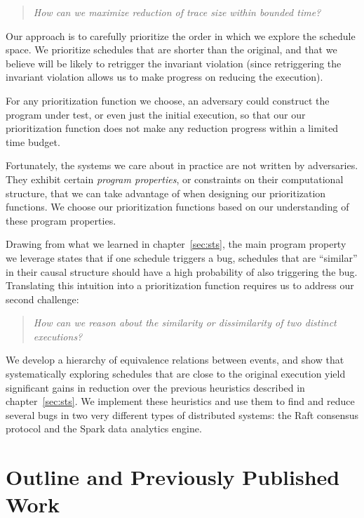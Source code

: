 \begin{quote}
\textit{How can we maximize reduction of trace size within bounded time?}
\end{quote}

Our approach is to carefully prioritize the order in which we explore
the schedule space. We prioritize schedules that are shorter than the
original, and that we believe will be likely to
retrigger the invariant violation (since retriggering the invariant violation allows us to make
progress on reducing the execution).

For any prioritization function we choose, an adversary could construct
the program under test, or even just the initial execution, so that our our prioritization
function does not make any reduction progress within a limited time budget.

Fortunately, the systems we care about in practice are not written by
adversaries. They exhibit certain \textit{program properties}, or constraints
on their computational structure,
that we can take advantage of when designing our prioritization functions.
We choose our
prioritization functions based on our understanding of these program
properties.

Drawing from what we learned in
chapter~\ref{sec:sts}, the main program property we leverage states that if one schedule triggers a bug,
schedules that are ``similar'' in their causal structure should have a high probability of also triggering the bug.
Translating this intuition into a prioritization function requires us to address our second challenge:

\begin{quote}
\textit{How can we reason about the similarity or dissimilarity of two distinct executions?}
\end{quote}

We develop a hierarchy of equivalence relations between events, and show
that systematically exploring schedules that are close to the original
execution yield significant gains in reduction over the previous
heuristics described in chapter~\ref{sec:sts}. We implement these heuristics
and use them to find and reduce several bugs in two very different types of distributed
systems: the Raft consensus protocol
and the Spark data analytics engine.

\section{Outline and Previously Published Work}

